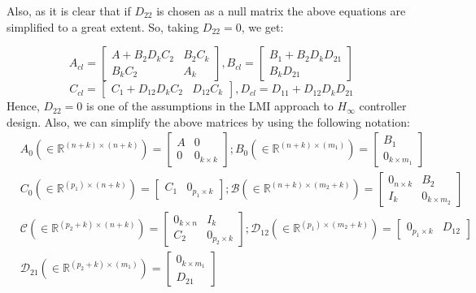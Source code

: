 \documentclass[a4paper,12pt]{article}
\begin{document}
		Also, as it is clear that if $D_{22}$ is chosen as a null matrix the above equations are simplified to a great extent. So, taking $D_{22} = 0$, we get:

		\[
		A_{cl} = \begin{bmatrix}
		A + B_{2}D_{k}C_{2} & B_{2}C_{k} \\
		B_{k}C_{2} & A_{k}
		\end{bmatrix},
		B_{cl} = \begin{bmatrix}
		B_{1}+B_{2}D_{k}D_{21} \\
		B_{k}D_{21}
		\end{bmatrix}
		\]
		\[
		C_{cl} = \begin{bmatrix} 
		C_{1} + D_{12}D_{k}C_{2} & D_{12}C_{k}
		\end{bmatrix},
		D_{cl}=D_{11}+D_{12}D_{k}D_{21}
		\]
		Hence, $D_{22}=0$ is one of the assumptions in the LMI approach to $H_{\infty}$ controller design. Also, we can simplify the above matrices by using the following notation:
		\begin{align}
		\label{not}
		&A_{0} (\in \mathbb{R}^{(n+k) \times (n+k)})= \begin{bmatrix}
		A & 0 \\ 0 & 0_{k \times k}
		\end{bmatrix};
		B_{0} (\in \mathbb{R}^{(n+k) \times (m_{1})})= \begin{bmatrix}
		B_{1} \\ 0_{k \times m_{1}}
		\end{bmatrix}\\
		&C_{0} (\in \mathbb{R}^{(p_{1}) \times (n+k)})= \begin{bmatrix}
		C_{1} & 0_{p_{1} \times k}
		\end{bmatrix};
		\mathscr{B} (\in \mathbb{R}^{(n+k) \times (m_{2}+k)})=\begin{bmatrix}
		0_{n \times k} & B_{2} \\ I_{k} & 0_{k \times m_{2}}
		\end{bmatrix}
		\\
		&\mathscr{C}(\in \mathbb{R}^{(p_{2}+k) \times (n+k)}) = \begin{bmatrix}
		0_{k \times n} & I_{k} \\
		C_{2} & 0_{p_{2} \times k}
		\end{bmatrix};
		\mathscr{D}_{12}(\in \mathbb{R}^{(p_{1}) \times (m_{2}+k)}) = \begin{bmatrix}
		0_{p_{1} \times {k}} & D_{12}
		\end{bmatrix}\\
		&\mathscr{D}_{21}(\in \mathbb{R}^{(p_{2}+k) \times (m_{1})})= \begin{bmatrix}
		0_{k \times m_{1}} \\ D_{21}
		\end{bmatrix}
		\end{align}
\end{document}
